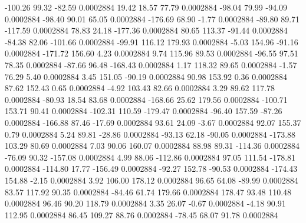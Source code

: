      -100.26       99.32      -82.59     0.0002884
       19.42       18.57       77.79     0.0002884
      -98.04       79.99      -94.09     0.0002884
      -98.40       90.01       65.05     0.0002884
     -176.69       68.90       -1.77     0.0002884
      -89.80       89.71     -117.59     0.0002884
       78.83       24.18     -177.36     0.0002884
       80.65      113.37      -91.44     0.0002884
      -84.38       82.06     -101.66     0.0002884
      -99.91      116.12      179.93     0.0002884
       -5.03      154.96      -91.16     0.0002884
     -171.72      156.60        4.23     0.0002884
        9.74      115.96       89.53     0.0002884
      -96.55       97.51       78.35     0.0002884
      -87.66       96.48     -168.43     0.0002884
        1.17      118.32       89.65     0.0002884
       -1.57       76.29        5.40     0.0002884
        3.45      151.05      -90.19     0.0002884
       90.98      153.92        0.36     0.0002884
       87.62      152.43        0.65     0.0002884
       -4.92      103.43       82.66     0.0002884
        3.29       89.62      117.78     0.0002884
      -80.93       18.54       83.68     0.0002884
     -168.66       25.62      179.56     0.0002884
     -100.71      153.71       90.41     0.0002884
     -102.31      110.59     -179.47     0.0002884
      -96.40      157.59      -87.26     0.0002884
     -166.88       87.46      -17.69     0.0002884
       93.61       24.09       -3.67     0.0002884
       92.07      155.37        0.79     0.0002884
        5.24       89.81      -28.86     0.0002884
      -93.13       62.18      -90.05     0.0002884
     -173.88      103.29       80.69     0.0002884
        7.03       90.06      160.07     0.0002884
       88.98       89.31     -114.36     0.0002884
      -76.09       90.32     -157.08     0.0002884
        4.99       88.06     -112.86     0.0002884
       97.05      111.54     -178.81     0.0002884
     -114.80       17.77     -156.49     0.0002884
      -92.27      152.78      -90.53     0.0002884
     -174.43      154.88       -2.15     0.0002884
        3.92      106.00      178.12     0.0002884
       96.65       64.08      -89.99     0.0002884
       83.57      117.92       90.35     0.0002884
      -84.46       61.74      179.66     0.0002884
      178.47       93.48      110.48     0.0002884
       96.46       90.20      118.79     0.0002884
        3.35       26.07       -0.67     0.0002884
       -4.18       90.91      112.95     0.0002884
       86.45      109.27       88.76     0.0002884
      -78.45       68.07       91.78     0.0002884

